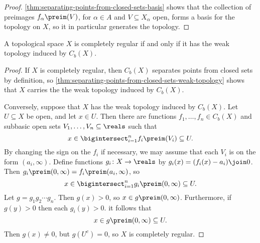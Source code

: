 \documentclass[article, a4paper, 11pt, oneside]{memoir}
\numberwithin{equation}{chapter}
\begin{document}
\begin{proof}
    \cref{thm:separating-points-from-closed-sets-basis} shows that the collection of preimages $f_\alpha\preim(V)$, for $\alpha \in A$ and $V \subseteq X_\alpha$ open, forms a basis for the topology on $X$, so it in particular generates the topology.
\end{proof}



\begin{theorem}
    \label{thm:completely-regular-weak-topology}
    A topological space $X$ is completely regular if and only if it has the weak topology induced by $C_b(X)$.
\end{theorem}

\begin{proof}
    If $X$ is completely regular, then $C_b(X)$ separates points from closed sets by definition, so \cref{thm:separating-points-from-closed-sets-weak-topology} shows that $X$ carries the the weak topology induced by $C_b(X)$.

    Conversely, suppose that $X$ has the weak topology induced by $C_b(X)$. Let $U \subseteq X$ be open, and let $x \in U$. Then there are functions $f_1, \ldots, f_n \in C_b(X)$ and subbasic open sets $V_1, \ldots, V_n \subseteq \reals$ such that
    \begin{equation*}
        x
            \in \bigintersect_{i=1}^n f_i\preim(V_i)
            \subseteq U.
    \end{equation*}
    By changing the sign on the $f_i$ if necessary, we may assume that each $V_i$ is on the form $(a_i, \infty)$. Define functions $g_i \colon X \to \reals$ by $g_i(x) = (f_i(x) - a_i) \join 0$. Then $g_i\preim(0,\infty) = f_i\preim(a_i,\infty)$, so
    \begin{equation*}
        x
            \in \bigintersect_{i=1}^n g_i\preim(0,\infty)
            \subseteq U.
    \end{equation*}
    Let $g = g_1 g_2 \cdots g_n$. Then $g(x) > 0$, so $x \in g\preim(0,\infty)$. Furthermore, if $g(y) > 0$ then each $g_i(y) > 0$. it follows that
    \begin{equation*}
        x
            \in g\preim(0,\infty)
            \subseteq U.
    \end{equation*}
    Then $g(x) \neq 0$, but $g(U^c) = 0$, so $X$ is completely regular.
\end{proof}


\end{document}
